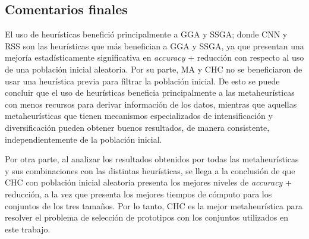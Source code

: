 \subsection{Comentarios finales}

El uso de heurísticas benefició principalmente a GGA y SSGA; donde CNN y RSS son las heurísticas que más benefician a GGA y SSGA, ya que presentan una mejoría estadísticamente significativa en \emph{accuracy} + reducción con respecto al uso de una población inicial aleatoria. Por su parte, MA y CHC no se beneficiaron de usar una heurística previa para filtrar la población inicial. De esto se puede concluir que el uso de heurísticas beneficia principalmente a las metaheurísticas con menos recursos para derivar información de los datos, mientras que aquellas metaheurísticas que tienen mecanismos especializados de intensificación y diversificación pueden obtener buenos resultados, de manera consistente, independientemente de la población inicial.

Por otra parte, al analizar los resultados obtenidos por todas las metaheurísticas y sus combinaciones con las distintas heurísticas, se llega a la conclusión de que CHC con población inicial aleatoria presenta los mejores niveles de \emph{accuracy} + reducción, a la vez que presenta los mejores tiempos de cómputo para los conjuntos de los tres tamaños. Por lo tanto, CHC es la mejor metaheurística para resolver el problema de selección de prototipos con los conjuntos utilizados en este trabajo.